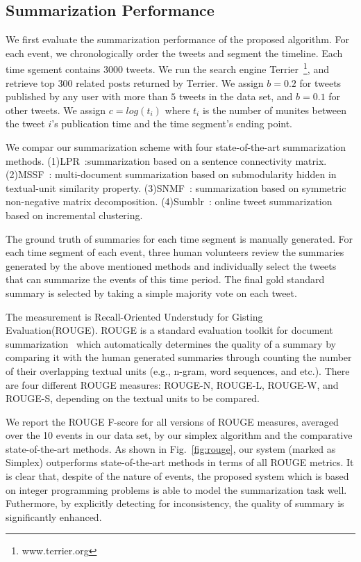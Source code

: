 \documentclass[envcountsame]{llncs}
\begin{document}
\subsection{Summarization Performance} 
We first evaluate the summarization performance of the proposed algorithm. For each event, we chronologically order the tweets and segment the timeline. Each time sgement contains 3000 tweets. We run the search engine Terrier~\footnote{www.terrier.org}, and  retrieve top 300 related posts returned by Terrier. We assign $b=0.2$ for tweets published by any user with more than $5$ tweets in the data set, and $b=0.1$ for other tweets. We assign $c=log(t_i)$ where $t_i$ is the number of munites between the tweet $i$'s publication time and the time segment's ending point.  
 
We compar our summarization scheme with  four state-of-the-art summarization methods. (1)LPR~\cite{LPR}:summarization based on a sentence connectivity matrix. (2)MSSF~\cite{MSSF}:  multi-document summarization based on submodularity hidden in textual-unit similarity property. (3)SNMF~\cite{SNMF}: summarization based on  symmetric non-negative matrix decomposition. (4)Sumblr~\cite{Shou2013Sumblr}: online tweet summarization based on incremental clustering.

The ground truth of summaries for each time segment is manually generated. For each time segment of each event, three human volunteers review the summaries generated by the above mentioned methods and individually select the tweets that can summarize the events of this time period. The final gold standard summary is selected by taking a simple majority vote on each tweet.


The measurement is  Recall-Oriented Understudy for Gisting Evaluation(ROUGE). ROUGE is a standard evaluation toolkit for document summarization~\cite{ROUGE} which automatically determines the quality of a summary by comparing it with the human generated summaries through counting the number of their overlapping textual units (e.g., n-gram, word sequences, and etc.). There are four different ROUGE measures: ROUGE-N, ROUGE-L, ROUGE-W, and ROUGE-S, depending on the textual units to be compared.

We report the  ROUGE F-score for all versions of ROUGE measures, averaged over the 10 events in our data set, by our simplex algorithm and the comparative state-of-the-art methods. As shown in Fig.~\ref{fig:rouge}, our system (marked as Simplex) outperforms state-of-the-art methods in terms of all ROUGE metrics. It is clear that, despite of the nature of events, the proposed system which is based on integer programming problems is able to model the summarization task well. Futhermore, by explicitly detecting for inconsistency, the quality of summary is significantly enhanced. 
\end{document}
